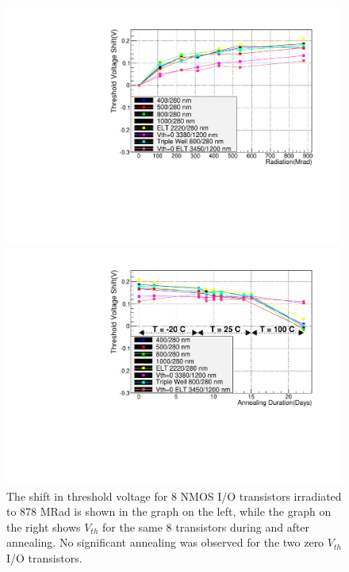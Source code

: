 \begin{figure}
\begin{minipage}[b]{0.5\textwidth}
	\centering
	\includegraphics[width=\linewidth]{Comparing_ThreshVolt_DGNMOS_paper.pdf}
\end{minipage}
\hspace{0.5cm}
\begin{minipage}[b]{0.5\textwidth}
	\centering
	\includegraphics[width=\linewidth]{Comparing_ThreshVolt_Anneal_DGNMOS_paper.pdf}
\end{minipage}
\caption{The shift in threshold voltage for 8 NMOS I/O transistors irradiated to 878 MRad is shown in the graph on the left, while the graph on the right shows $V_{th}$ for the same 8 transistors during and after annealing.  No significant annealing was observed for the two zero $V_{th}$ I/O transistors.}
\label{fig:DGNMOS_Vth}
\end{figure}

